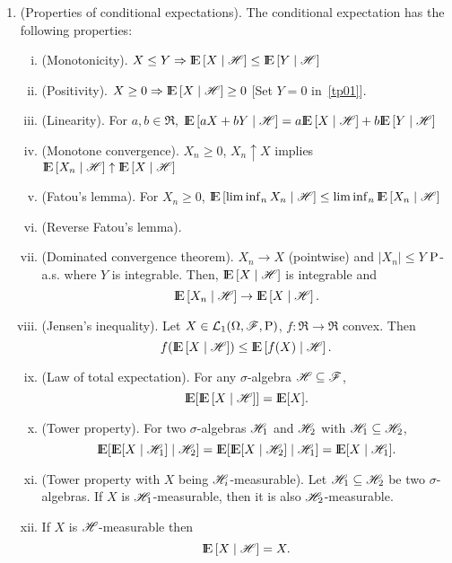 \documentclass[a4paper,10pt]{article}
\newcommand{\ce}[1]{\E\left[#1 {}\mid{} \H \right]}
\begin{document}
\begin{enumerate}
 \item (Properties of conditional expectations). 
       The conditional expectation has the following properties:
       \begin{enumerate}[(i)]
	\item \label{tp01} (Monotonicity). $X\leq Y \Rightarrow \ce{X} \leq \ce{Y}$
	\item (Positivity).  $X\geq 0 \Rightarrow \ce{X} \geq 0$ [Set $Y=0$ in~\ref{tp01}]. 
	\item (Linearity). For $a,b\in\Re$, $\ce{aX+bY}=a\ce{X} + b \ce{Y}$
	\item (Monotone convergence). $X_n\geq 0$, $X_n \uparrow X$ implies $\ce{X_n}\uparrow \ce{X}$
	\item (Fatou's lemma). For $X_n\geq 0$, $\ce{\liminf_n X_n}\leq \liminf_n \ce{X_n}$
	\item (Reverse Fatou's lemma).
	\item (Dominated convergence theorem). $X_n\to X$ (pointwise) and $|X_n|\leq Y$ $\mathrm{P}$-a.s. where $Y$ is
	      integrable. Then, $\ce{X}$ is integrable and 
	      \[
	       \ce{X_n} \to \ce{X}.
	      \]
        \item (Jensen's inequality). Let $X\in\mathcal{L}_1(\Omega,\mathscr{F},\mathrm{P})$, $f:\Re\to\Re$ convex. Then
	      \[
	      f(\ce{X})\leq \ce{f(X)}.
	      \]
        \item (Law of total expectation). For any $\sigma$-algebra $\mathscr{H} \subseteq \mathscr{F}$,
	      \[
	       \E[\ce{X}] = \E[X].
	      \]
        \item (Tower property). For two $\sigma$-algebras $\mathscr{H}_1$ and $\mathscr{H}_2$ with $\mathscr{H}_1\subseteq \mathscr{H}_2$,	      
	      \[
	       \E[\E[X {}\mid{} \H_1] {}\mid{} \H_2] = \E[\E[X {}\mid{} \H_2] {}\mid{} \H_1] = \E[X {}\mid{} \H_1].
	      \]
        \item (Tower property with $X$ being $\mathscr{H}_i$-measurable). Let $\mathscr{H}_1\subseteq \mathscr{H}_2$ be two $\sigma$-algebras. 
	      If $X$ is $\mathscr{H}_1$-measurable, then it is also $\mathscr{H}_2$-measurable.
	    

        \item If $X$ is $\mathscr{H}$-measurable then
	      \[
	       \ce{X} = X.
	      \]

       \end{enumerate}
\end{enumerate}
\end{document}
